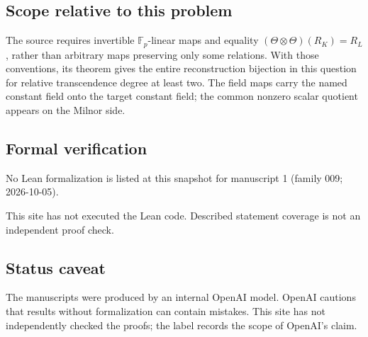 \documentclass[11pt]{article}
\begin{document}
\subsection{Scope relative to this problem}
The source requires invertible $\mathbb F_p$-linear maps and equality $(\Theta\otimes\Theta)(R_K)=R_L$, rather than arbitrary maps preserving only some relations. With those conventions, its theorem gives the entire reconstruction bijection in this question for relative transcendence degree at least two. The field maps carry the named constant field onto the target constant field; the common nonzero scalar quotient appears on the Milnor side.

\subsection{Formal verification}
No Lean formalization is listed at this snapshot for manuscript 1 (family 009; 2026-10-05).

This site has not executed the Lean code. Described statement coverage is not an independent proof check.

\subsection{Status caveat}
The manuscripts were produced by an internal OpenAI model. OpenAI cautions that results without formalization can contain mistakes. This site has not independently checked the proofs; the label records the scope of OpenAI's claim.
\end{document}
